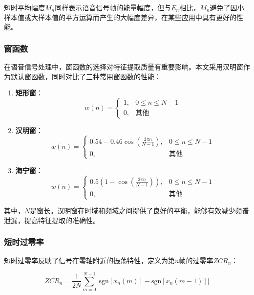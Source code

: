\documentclass[sigconf,nonacm]{acmart}
\begin{document}
短时平均幅度$M_n$同样表示语音信号帧的能量幅度，但与$E_n$相比，$M_n$避免了因小样本值或大样本值的平方运算而产生的大幅度差异，在某些应用中具有更好的性能。

\subsubsection{窗函数}

在语音信号处理中，窗函数的选择对特征提取质量有重要影响。本文采用汉明窗作为默认窗函数，同时对比了三种常用窗函数的性能：

\begin{enumerate}
\item \textbf{矩形窗}：
\begin{equation}
w(n) = \begin{cases}
1, & 0 \leq n \leq N-1 \\
0, & \text{其他}
\end{cases}
\end{equation}

\item \textbf{汉明窗}：
\begin{equation}
w(n) = \begin{cases}
0.54 - 0.46\cos\left(\frac{2\pi n}{N-1}\right), & 0 \leq n \leq N-1 \\
0, & \text{其他}
\end{cases}
\end{equation}

\item \textbf{海宁窗}：
\begin{equation}
w(n) = \begin{cases}
0.5\left(1 - \cos\left(\frac{2\pi n}{N-1}\right)\right), & 0 \leq n \leq N-1 \\
0, & \text{其他}
\end{cases}
\end{equation}
\end{enumerate}

其中，$N$是窗长。汉明窗在时域和频域之间提供了良好的平衡，能够有效减少频谱泄漏，提高特征提取的准确性。

\subsubsection{短时过零率}

短时过零率反映了信号在零轴附近的振荡特性，定义为第$n$帧的过零率$ZCR_n$：

\begin{equation}
ZCR_n = \frac{1}{2N} \sum_{m=0}^{N-1} |\text{sgn}[x_n(m)] - \text{sgn}[x_n(m-1)]|
\end{equation}
\end{document}
